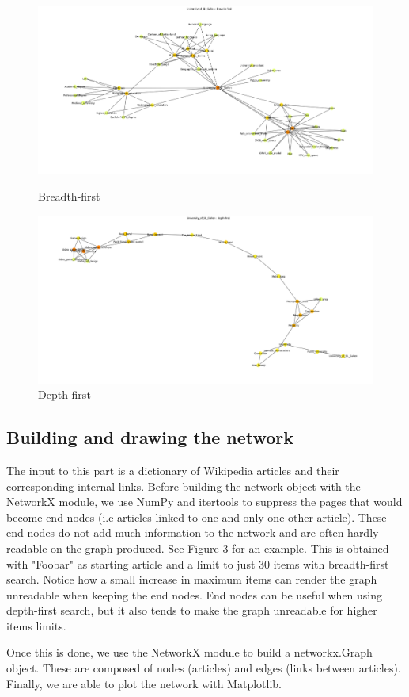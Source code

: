 \documentclass[10pt]{article}
\begin{document}
		\begin{figure}[H]
		\begin{center}
			\includegraphics[width=\textwidth]{figure1.png}
    			 	\caption{Breadth-first}
				
			\vspace{3cm}
			
			\includegraphics[width=\textwidth]{figure2.png}
  			  	\caption{Depth-first}
		\end{center}
		\end{figure}
	
	
	\subsection{Building and drawing the network}
	The input to this part is a dictionary of Wikipedia articles and their corresponding internal links. Before building the network object with the NetworkX module, we use NumPy and 	itertools to suppress the pages that would become end nodes (i.e articles linked to one and only one other article). These end nodes do not add much information to the network 	and are often hardly readable on the graph produced. See Figure 3 for an example. This is obtained with "Foobar" as starting article and a limit to just 30 items with breadth-first 	search. Notice how a small increase in maximum items can render the graph unreadable when keeping the end nodes. End nodes can be useful when using depth-first search, but 	it also tends to make the graph unreadable for higher items limits.
	\par \noindent
	Once this is done, we use the NetworkX module to build a networkx.Graph object. These are composed of nodes (articles) and edges (links between articles). Finally, we are able 	to plot the network with Matplotlib.\par \noindent
	
\end{document}
